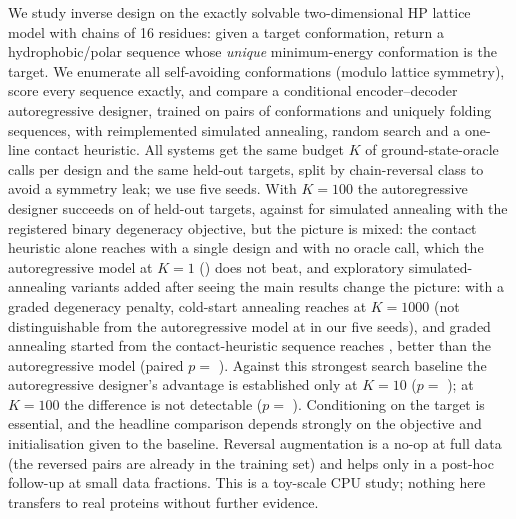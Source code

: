 We study inverse design on the exactly solvable two-dimensional HP lattice model with chains of 16 residues: given a target conformation, return a hydrophobic/polar sequence whose \emph{unique} minimum-energy conformation is the target. We enumerate all  self-avoiding conformations (modulo lattice symmetry), score every sequence exactly, and compare a conditional encoder--decoder autoregressive designer, trained on pairs of conformations and uniquely folding sequences, with reimplemented simulated annealing, random search and a one-line contact heuristic. All systems get the same budget $K$ of ground-state-oracle calls per design and the same held-out targets, split by chain-reversal class to avoid a symmetry leak; we use five seeds. With $K=100$ the autoregressive designer succeeds on  of held-out targets, against  for simulated annealing with the registered binary degeneracy objective, but the picture is mixed: the contact heuristic alone reaches  with a single design and with no oracle call, which the autoregressive model at $K=1$ () does not beat, and exploratory simulated-annealing variants added after seeing the main results change the picture: with a graded degeneracy penalty, cold-start annealing reaches  at $K=1000$ (not distinguishable from the autoregressive model at  in our five seeds), and graded annealing started from the contact-heuristic sequence reaches , better than the autoregressive model (paired $p=$ ). Against this strongest search baseline the autoregressive designer's advantage is established only at $K=10$ ($p=$ ); at $K=100$ the difference is not detectable ($p=$ ). Conditioning on the target is essential, and the headline comparison depends strongly on the objective and initialisation given to the baseline. Reversal augmentation is a no-op at full data (the reversed pairs are already in the training set) and helps only in a post-hoc follow-up at small data fractions. This is a toy-scale CPU study; nothing here transfers to real proteins without further evidence.
